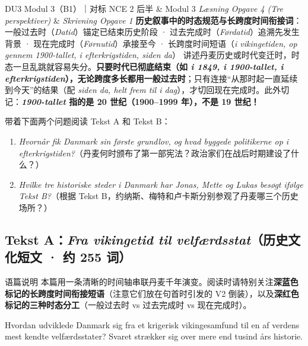 {DU3 Modul 3（B1）｜对标 NCE 2 后半 \& Modul 3 \textit{Læsning Opgave 4 (Tre perspektiver)} \& \textit{Skrivning Opgave 1}}
{\textbf{历史叙事中的时态规范与长跨度时间衔接词}：一般过去时（\textit{Datid}）锚定已结束历史阶段 · 过去完成时（\textit{Førdatid}）追溯先发生背景 · 现在完成时（\textit{Førnutid}）承接至今 · 长跨度时间短语（\textit{i vikingetiden, op gennem 1900-tallet, i efterkrigstiden, siden da}）}
{讲述丹麦历史或时代变迁时，时态一旦乱跳就容易失分。\textbf{只要时代已彻底结束（如 \textit{i 1849, i 1900-tallet, i efterkrigstiden}），无论跨度多长都用一般过去时}；只有连接“从那时起一直延续到今天”的结果（配 \textit{siden da, helt frem til i dag}），才切回现在完成时。此外切记：\textbf{\textit{1900-tallet} 指的是 20 世纪（1900--1999 年），不是 19 世纪！}}

\begin{foerduleaeser}
带着下面两个问题阅读 Tekst A 和 Tekst B：
\begin{enumerate}
  \item \textit{Hvornår fik Danmark sin første grundlov, og hvad byggede politikerne op i efterkrigstiden?}（丹麦何时颁布了第一部宪法？政治家们在战后时期建设了什么？）
  \item \textit{Hvilke tre historiske steder i Danmark har Jonas, Mette og Lukas besøgt ifølge Tekst B?}（根据 Tekst B，约纳斯、梅特和卢卡斯分别参观了丹麦哪三个历史场所？）
\end{enumerate}
\end{foerduleaeser}


\subsection*{Tekst A：\textit{Fra vikingetid til velfærdsstat}（历史文化短文 · 约 255 词）}

\begin{tipbox}{语篇说明}
本篇用一条清晰的时间轴串联丹麦千年演变。阅读时请特别关注\textbf{\color{NCDNavy}深蓝色标记的长跨度时间衔接短语}（注意它们放在句首时引发的 V2 倒装），以及\textbf{\color{NCDRed}深红色标记的三种时态分工}（一般过去时 vs 过去完成时 vs 现在完成时）。
\end{tipbox}

Hvordan udviklede Danmark sig fra et krigerisk vikingesamfund til en af verdens mest kendte velfærdsstater? Svaret strækker sig over mere end tusind års historie.

